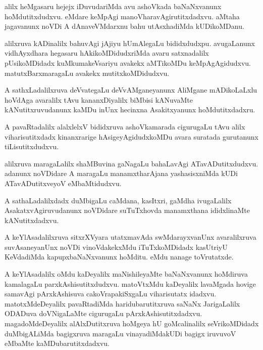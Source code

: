 \documentclass{article}
\begin{document}
\begin{mn}%
alilx heMgasaru hejejx iDuvudariMda avu ashoVkada baNaNxvanunx hoMdutitxdudxvu. eMdare 
keMpAgi manoVharavAgirutitxdadxvu. aMtaha jagavanunx noVDi A dAnaveVMdarxnu bahu 
utAsxhadiMda kUDikoMDanu.
\end{mn}

\begin{mn}%
alilxruva kADinalilx bahuvAgi jAjiyu hUmAlegaLu bididxdudxpu. avugaLanunx vidhAyxdhara 
hegasaru hAkikoMDidudxriMda avaru satxnadalilx pUsikoMDidadx kuMkumakeVsariyu avakekx 
aMTikoMDu keMpAgAgidudxvu. matutxBarxmaragaLu avakekx mutitxkoMDidudxvu.
\end{mn}

\begin{mn}%
A sathxLadalilxruva deVvategaLu deVvAMganeyanunx AliMgane mADikoLaLxlu hoVdAga avaralilx 
tAvu kananxDiyalilx biMbisi kANuvaMte kANutitxruvudanunx kaMDu inUnx hecinxna Asakitxyanunx 
hoMdutitxdadxru.
\end{mn}

\begin{mn}%
A pavaRtadalilx alalxlelxV bididxruva ashoVkamarada cigurugaLu tAvu alilx viharisutitxdadx 
kinanxrarige hAsigeyAgidudxkoMDu avara suratada gurutanunx tiLisutitxdudxvu.
\end{mn}

\begin{mn}%
alilxruva maragaLalilx shaMBuvina gaNagaLu bahaLavAgi ATavADutitxdudxvu. adanunx noVDidare A 
maragaLu manamxtharAjana yashasisxniMda kUDi ATavADutitxveyoV eMbaMtidudxvu.
\end{mn}

\begin{mn}%
A sathaLadalilxdadx duMbigaLu caMdana, kasItxri, gaMdha ivugaLalilx AsakatxvAgiruvudanunx 
noVDidare suTuTxhovda manamxthana ididxlinaMte kANutitxdadxvu.
\end{mn}

\begin{mn}%
A keYlAsadalilxruva sitxrXVyara utatxmavAda swMdarayxvanUnx avaralilxruva suvAsaneyanUnx 
noVDi vinoVdakekxMdu iTuTxkoMDidadx kasUtriyU KeVdadiMda kapupxbaNaNxvanunx hoMditu. eMdu 
nanage toVrutatxde.
\end{mn}

\begin{mn}%
A keYlAsadalilx oMdu kaDeyalilx maNishileyaMte baNaNxvanunx hoMdiruva kamalagaLu 
parxkAshisutitxdudxvu. matoVtxMdu kaDeyalilx lavaMgada hovige samavAgi pArxkAshisuva 
cakoVrapakiSxgaLu viharisutatx idadxvu. matotxMdeDeyalilx pavaRtadiMda haridubarutitxruva 
saNaNx JarigaLalilx ODADuva doVNigaLaMte cigurugaLu pArxkAshisutitxdadxvu. magadoMdeDeyalilx 
alAlxDutitxruva hoMgeya hU goMcalinalilx seVrikoMDidadx duMbigALiMda bagigxruva maragaLu 
vinayadiMdakUDi bagigx iruvuvoV eMbaMte kaMDubarutitxdadxvu.
\end{mn}
\end{document}

